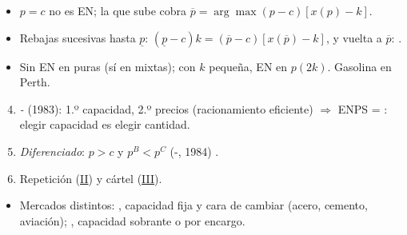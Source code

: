 \documentclass{article}
\begin{document}
\begin{columnas}
\begin{enumerate}
\begin{itemize}
  \item $p=c$ no es EN; la que sube cobra $\overline{p}=\arg\max(p-c)[x(p)-k]$.
  \item Rebajas sucesivas hasta $\underline{p}$: $(\underline{p}-c)k=(\overline{p}-c)[x(\overline{p})-k]$, y vuelta a $\overline{p}$: .
  \item Sin EN en puras (sí en mixtas); con $k$ pequeña, EN en $p(2k)$. Gasolina en Perth.
  \end{itemize}
\end{enumerate}
\begin{enumerate}\setcounter{enumi}{3}
\item \emph{-} (1983): 1.º capacidad, 2.º precios (racionamiento eficiente) $\Rightarrow$ ENPS = : elegir capacidad es elegir cantidad.
\item \emph{Diferenciado}: $p>c$ y $p^B<p^C$ (-, 1984) .
\item Repetición (\hyperref[rep:II]{II}) y cártel (\hyperref[rep:III]{III}).
\end{enumerate}
\begin{itemize}
\item Mercados distintos: , capacidad fija y cara de cambiar (acero, cemento, aviación); , capacidad sobrante o por encargo.
\end{itemize}


\end{columnas}
\end{document}
